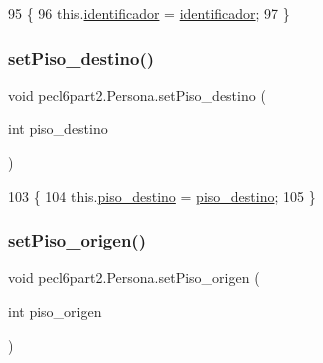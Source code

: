 \begin{DoxyCode}
95                                                     \{
96         this.\mbox{\hyperlink{classpecl6part2_1_1_persona_a8b7b7d11bc23cac7514d1e3c20267589}{identificador}} = \mbox{\hyperlink{classpecl6part2_1_1_persona_a8b7b7d11bc23cac7514d1e3c20267589}{identificador}};
97     \}
\end{DoxyCode}
\mbox{\label{classpecl6part2_1_1_persona_a38bfea69924f22a88618ff2ae79b798d}} 
\subsubsection{\texorpdfstring{set\+Piso\+\_\+destino()}{setPiso\_destino()}}
{\footnotesize\ttfamily void pecl6part2.\+Persona.\+set\+Piso\+\_\+destino (\begin{DoxyParamCaption}\item[{int}]{piso\+\_\+destino }\end{DoxyParamCaption})\hspace{0.3cm}{\ttfamily [inline]}}


\begin{DoxyCode}
103                                                   \{
104         this.\mbox{\hyperlink{classpecl6part2_1_1_persona_af4ceab86e7c49fa1416c701c21479a8b}{piso\_destino}} = \mbox{\hyperlink{classpecl6part2_1_1_persona_af4ceab86e7c49fa1416c701c21479a8b}{piso\_destino}};
105     \}
\end{DoxyCode}
\mbox{\label{classpecl6part2_1_1_persona_a416b5dd477369f8ccbe23385450142c7}} 
\subsubsection{\texorpdfstring{set\+Piso\+\_\+origen()}{setPiso\_origen()}}
{\footnotesize\ttfamily void pecl6part2.\+Persona.\+set\+Piso\+\_\+origen (\begin{DoxyParamCaption}\item[{int}]{piso\+\_\+origen }\end{DoxyParamCaption})\hspace{0.3cm}{\ttfamily [inline]}}



